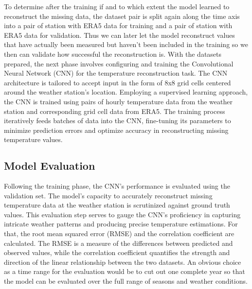 To determine after the training if and to which extent the model learned to reconstruct the missing data, the dataset pair is split again along the time axis into a pair of station with ERA5 data for training and a pair of station with ERA5 data for validation. Thus we can later let the model reconstruct values that have actually been measured but haven't been included in the training so we then can validate how successful the reconstruction is.
With the datasets prepared, the next phase involves configuring and training the Convolutional Neural Network (CNN) for the temperature reconstruction task.
The CNN architecture is tailored to accept input in the form of 8x8 grid cells centered around the weather station's location.
Employing a supervised learning approach, the CNN is trained using pairs of hourly temperature data from the weather station and corresponding grid cell data from ERA5.
The training process iteratively feeds batches of data into the CNN, fine-tuning its parameters to minimize prediction errors and optimize accuracy in reconstructing missing temperature values.


\subsection{Model Evaluation}
Following the training phase, the CNN's performance is evaluated using the validation set.
The model's capacity to accurately reconstruct missing temperature data at the weather station is scrutinized against ground truth values.
This evaluation step serves to gauge the CNN's proficiency in capturing intricate weather patterns and producing precise temperature estimations.
For that, the root mean squared error (RMSE) and the correlation coefficient are calculated.
The RMSE is a measure of the differences between predicted and observed values, while the correlation coefficient quantifies the strength and direction of the linear relationship between the two datasets.
An obvious choice as a time range for the evaluation would be to cut out one complete year so that the model can be evaluated over the full range of seasons and weather conditions.

